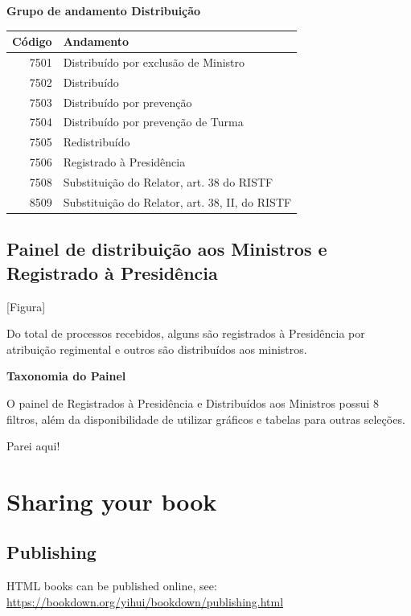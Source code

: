 \documentclass[
]{book}
\begin{document}
\textbf{Grupo de andamento Distribuição}

\begin{tabular}{r|l}
\hline
Código & Andamento\\
\hline
7501 & Distribuído por exclusão de Ministro\\
\hline
7502 & Distribuído\\
\hline
7503 & Distribuído por prevenção\\
\hline
7504 & Distribuído por prevenção de Turma\\
\hline
7505 & Redistribuído\\
\hline
7506 & Registrado à Presidência\\
\hline
7508 & Substituição do Relator, art. 38 do RISTF\\
\hline
8509 & Substituição do Relator, art. 38, II, do RISTF\\
\hline
\end{tabular}

\hypertarget{painel-de-distribuiuxe7uxe3o-aos-ministros-e-registrado-uxe0-presiduxeancia}{%
\section{Painel de distribuição aos Ministros e Registrado à Presidência}\label{painel-de-distribuiuxe7uxe3o-aos-ministros-e-registrado-uxe0-presiduxeancia}}

{[}Figura{]}

Do total de processos recebidos, alguns são registrados à Presidência por atribuição regimental e outros são distribuídos aos ministros.

\textbf{Taxonomia do Painel}

O painel de Registrados à Presidência e Distribuídos aos Ministros possui 8 filtros, além da disponibilidade de utilizar gráficos e tabelas para outras seleções.

Parei aqui!

\hypertarget{sharing-your-book}{%
\chapter{Sharing your book}\label{sharing-your-book}}

\hypertarget{publishing}{%
\section{Publishing}\label{publishing}}

HTML books can be published online, see: \url{https://bookdown.org/yihui/bookdown/publishing.html}
\end{document}
